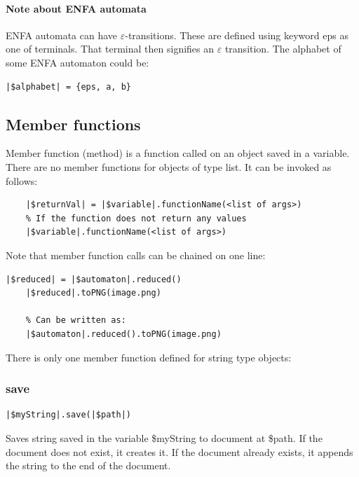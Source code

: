 \documentclass{ctuthesis}
\begin{document}
\paragraph{Note about ENFA automata}
ENFA automata can have $\varepsilon$-transitions. These are defined using keyword eps as one of terminals. That terminal then signifies an $\varepsilon$ transition. The alphabet of some ENFA automaton could be:
\begin{lstlisting}[language = JASL]
	|$alphabet| = {eps, a, b}
\end{lstlisting} 

\subsection{Member functions}
\label{subsec:member-functions}
Member function (method) is a function called on an object saved in a variable. There are no member functions for objects of type list. It can be invoked as follows:

\begin{minipage}{\linewidth}
\begin{lstlisting}[language = JASL_snippet]
	% If the function returns some value	
	|$returnVal| = |$variable|.functionName(<list of args>)	
	% If the function does not return any values
	|$variable|.functionName(<list of args>)
\end{lstlisting}
\end{minipage} 

Note that member function calls can be chained on one line:

\begin{minipage}{\linewidth}
\begin{lstlisting}[language = JASL]
	|$reduced| = |$automaton|.reduced()
	|$reduced|.toPNG(image.png)
	
	% Can be written as:
	|$automaton|.reduced().toPNG(image.png)
\end{lstlisting}
\end{minipage}

There is only one member function defined for string type objects:
\subsubsection{save}
\begin{lstlisting}[language = JASL_snippet]
	|$myString|.save(|$path|)
\end{lstlisting}

Saves string saved in the variable \$myString to document at \$path. If the document does not exist, it creates it. If the document already exists, it appends the string to the end of the document.
\end{document}
